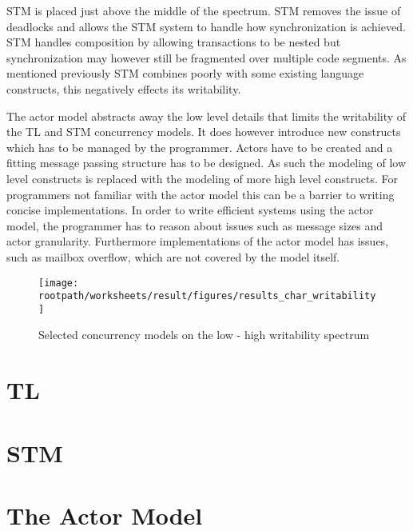 \ac{STM} is placed just above the middle of the spectrum. \ac{STM} removes the issue of deadlocks and allows the \ac{STM} system to handle how synchronization is achieved. \ac{STM} handles composition by allowing transactions to be nested but synchronization may however still be fragmented over multiple code segments. As mentioned previously \ac{STM} combines poorly with some existing language constructs, this negatively effects its writability.

The actor model abstracts away the low level details that limits the writability of the \ac{TL} and \ac{STM} concurrency models. It does however introduce new constructs which has to be managed by the programmer. Actors have to be created and a fitting message passing structure has to be designed. As such the modeling of low level constructs is replaced with the modeling of more high level constructs. For programmers not familiar with the actor model this can be a barrier to writing concise implementations. In order to write efficient systems using the actor model, the programmer has to reason about issues such as message sizes and actor granularity. Furthermore implementations of the actor model has issues, such as mailbox overflow, which are not covered by the model itself.

\begin{figure}[htbp]
\centering
 \texttt{[image: \\rootpath/worksheets/result/figures/results\_char\_writability]} 
 \caption{Selected concurrency models on the low - high writability spectrum}
\label{fig:results_char_writability}
\end{figure}

\section{\acl{TL}}
\section{\acl{STM}}
\section{The Actor Model}

\worksheetend
